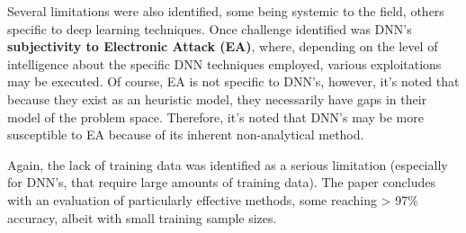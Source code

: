 Several limitations were also identified, some being systemic to the field, others specific to deep learning techniques.
Once challenge identified was  \ac{DNN}'s \textbf{subjectivity to Electronic Attack (EA)}, where, depending on the level of intelligence about the specific \ac{DNN} techniques employed, various exploitations may be executed.
Of course, EA is not specific to DNN's, however, it's noted that because they exist as an heuristic model, they necessarily have gaps in their model of the problem space.
Therefore, it's noted that DNN's may be more susceptible to EA because of its inherent non-analytical method.

Again, the lack of training data was identified as a serious limitation (especially for \ac{DNN}'s, that require large amounts of training data).
The paper concludes with an evaluation of particularly effective methods, some reaching > 97\% accuracy, albeit with small training sample sizes.



